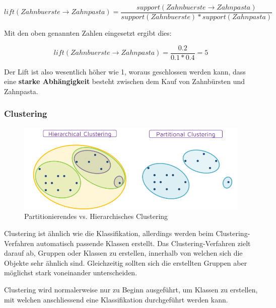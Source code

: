 \documentclass[a4paper, 11pt]{article}
\begin{document}
\begin{equation}
lift(Zahnbuerste \rightarrow Zahnpasta) = \dfrac{support({Zahnbuerste \rightarrow Zahnpasta})}{support(Zahnbuerste) * support(Zahnpasta)}
\end{equation}

Mit den oben genannten Zahlen eingesetzt ergibt dies:

\begin{equation}
	lift(Zahnbuerste \rightarrow Zahnpasta) = \dfrac{0.2}{0.1 * 0.4} = 5
\end{equation}

Der Lift ist also wesentlich höher wie 1, woraus geschlossen werden kann, dass eine \textbf{starke Abhängigkeit} besteht zwischen dem Kauf von Zahnbürsten und Zahnpasta.
 
 \newpage
 
 \subsubsection{Clustering}
 
  \begin{figure}[htb]
 	\centering
 	\includegraphics[keepaspectratio=true,height=12\baselineskip]{clustering.png}
 	\caption{Partitionierendes vs. Hierarchisches Clustering}
 	\label{fig:Clustering}
 \end{figure}
 
 Clustering ist ähnlich wie die Klassifikation, allerdings werden beim Clustering-Verfahren automatisch passende Klassen erstellt. Das Clustering-Verfahren zielt darauf ab, Gruppen oder Klassen zu erstellen, innerhalb von welchen sich die Objekte sehr ähnlich sind. Gleichzeitig sollten sich die erstellten Gruppen aber möglichst stark voneinander unterscheiden.
 
 Clustering wird normalerweise nur zu Beginn ausgeführt, um Klassen zu erstellen, mit welchen anschliessend eine Klassifikation durchgeführt werden kann.
 
 \vspace{10px}
 
\end{document}
